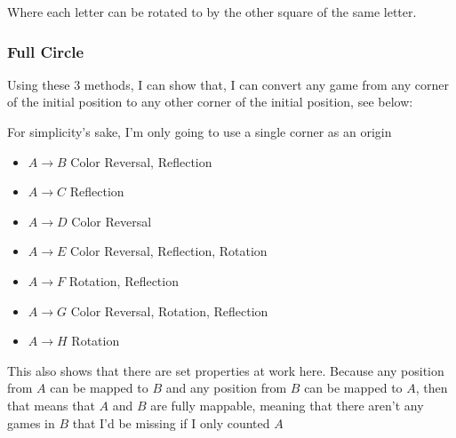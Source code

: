 \documentclass{article}
\begin{document}
\begin{othelloboard}{0.75}
\dotmarkings
{}
\end{othelloboard}

Where each letter can be rotated to by the other square of the same letter.

\subsubsection{Full Circle}

Using these 3 methods, I can show that, I can convert any game from any corner of the initial position to any other corner of the initial position, see below:

\begin{othelloboard}{0.75}
\dotmarkings
{}
\end{othelloboard}

For simplicity's sake, I'm only going to use a single corner as an origin

\begin{itemize}
\item $A\rightarrow B$ Color Reversal, Reflection
\item $A\rightarrow C$ Reflection
\item $A\rightarrow D$ Color Reversal
\item $A\rightarrow E$ Color Reversal, Reflection, Rotation
\item $A\rightarrow F$ Rotation, Reflection
\item $A\rightarrow G$ Color Reversal, Rotation, Reflection
\item $A\rightarrow H$ Rotation
\end{itemize}

This also shows that there are set properties at work here. Because any position from $A$ can be mapped to $B$ and any position from $B$ can be mapped to $A$, then that means that $A$ and $B$ are fully mappable, meaning that there aren't any games in $B$ that I'd be missing if I only counted $A$
\end{document}
